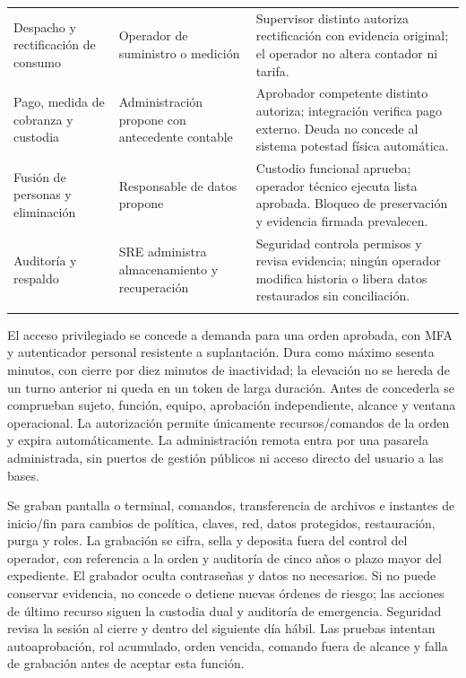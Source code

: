 \begin{longtable}{@{}L{.28\textwidth}L{.29\textwidth}L{\dimexpr.43\textwidth-12pt\relax}@{}}
Despacho y rectificación de consumo & Operador de suministro o medición & Supervisor distinto autoriza rectificación con evidencia original; el operador no altera contador ni tarifa. \\\addlinespace\hline
Pago, medida de cobranza y custodia & Administración propone con antecedente contable & Aprobador competente distinto autoriza; integración verifica pago externo. Deuda no concede al sistema potestad física automática. \\\addlinespace\hline
Fusión de personas y eliminación & Responsable de datos propone & Custodio funcional aprueba; operador técnico ejecuta lista aprobada. Bloqueo de preservación y evidencia firmada prevalecen. \\\addlinespace\hline
Auditoría y respaldo & SRE administra almacenamiento y recuperación & Seguridad controla permisos y revisa evidencia; ningún operador modifica historia o libera datos restaurados sin conciliación. \\\addlinespace\hline
\end{longtable}
\endgroup

El acceso privilegiado se concede a demanda para una orden aprobada, con MFA y autenticador personal resistente a suplantación. Dura como máximo sesenta minutos, con cierre por diez minutos de inactividad; la elevación no se hereda de un turno anterior ni queda en un token de larga duración. Antes de concederla se comprueban sujeto, función, equipo, aprobación independiente, alcance y ventana operacional. La autorización permite únicamente recursos/comandos de la orden y expira automáticamente. La administración remota entra por una pasarela administrada, sin puertos de gestión públicos ni acceso directo del usuario a las bases.

Se graban pantalla o terminal, comandos, transferencia de archivos e instantes de inicio/fin para cambios de política, claves, red, datos protegidos, restauración, purga y roles. La grabación se cifra, sella y deposita fuera del control del operador, con referencia a la orden y auditoría de cinco años o plazo mayor del expediente. El grabador oculta contraseñas y datos no necesarios. Si no puede conservar evidencia, no concede o detiene nuevas órdenes de riesgo; las acciones de último recurso siguen la custodia dual y auditoría de emergencia. Seguridad revisa la sesión al cierre y dentro del siguiente día hábil. Las pruebas intentan autoaprobación, rol acumulado, orden vencida, comando fuera de alcance y falla de grabación antes de aceptar esta función.


